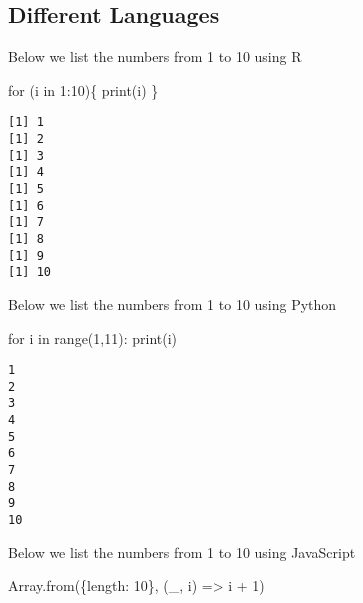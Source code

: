 \documentclass[
  letterpaper,
  DIV=11,
  numbers=noendperiod]{scrartcl}
\newenvironment{Shaded}{\begin{snugshade}}{\end{snugshade}}
\newcommand{\BuiltInTok}[1]{\textcolor[rgb]{0.00,0.23,0.31}{#1}}
\newcommand{\ControlFlowTok}[1]{\textcolor[rgb]{0.00,0.23,0.31}{#1}}
\newcommand{\DecValTok}[1]{\textcolor[rgb]{0.68,0.00,0.00}{#1}}
\newcommand{\FunctionTok}[1]{\textcolor[rgb]{0.28,0.35,0.67}{#1}}
\newcommand{\KeywordTok}[1]{\textcolor[rgb]{0.00,0.23,0.31}{#1}}
\newcommand{\NormalTok}[1]{\textcolor[rgb]{0.00,0.23,0.31}{#1}}
\newcommand{\SpecialCharTok}[1]{\textcolor[rgb]{0.37,0.37,0.37}{#1}}
\begin{document}
\hypertarget{different-languages}{%
\subsection{Different Languages}\label{different-languages}}

Below we list the numbers from 1 to 10 using R

\begin{Shaded}
\begin{Highlighting}[]
\ControlFlowTok{for}\NormalTok{ (i }\ControlFlowTok{in} \DecValTok{1}\SpecialCharTok{:}\DecValTok{10}\NormalTok{)\{}
  \FunctionTok{print}\NormalTok{(i)}
\NormalTok{\}}
\end{Highlighting}
\end{Shaded}

\begin{verbatim}
[1] 1
[1] 2
[1] 3
[1] 4
[1] 5
[1] 6
[1] 7
[1] 8
[1] 9
[1] 10
\end{verbatim}

Below we list the numbers from 1 to 10 using Python

\begin{Shaded}
\begin{Highlighting}[]
\ControlFlowTok{for}\NormalTok{ i }\KeywordTok{in} \BuiltInTok{range}\NormalTok{(}\DecValTok{1}\NormalTok{,}\DecValTok{11}\NormalTok{):}
  \BuiltInTok{print}\NormalTok{(i)}
\end{Highlighting}
\end{Shaded}

\begin{verbatim}
1
2
3
4
5
6
7
8
9
10
\end{verbatim}

Below we list the numbers from 1 to 10 using JavaScript

\begin{Shaded}
\begin{Highlighting}[]
\NormalTok{Array.from(\{length: 10\}, (\_, i) =\textgreater{} i + 1)}
\end{Highlighting}
\end{Shaded}
\end{document}
